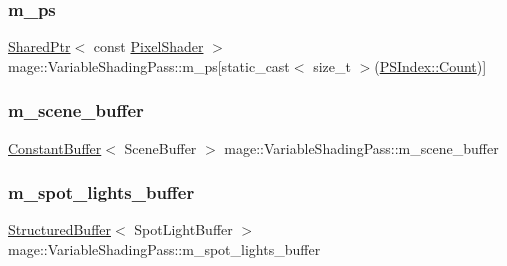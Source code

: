 \subsubsection{\texorpdfstring{m\+\_\+ps}{m\_ps}}
{\footnotesize\ttfamily \hyperlink{namespacemage_a1e01ae66713838a7a67d30e44c67703e}{Shared\+Ptr}$<$ const \hyperlink{namespacemage_ac98506b7edd999ea43ec46fbd0330238}{Pixel\+Shader} $>$ mage\+::\+Variable\+Shading\+Pass\+::m\+\_\+ps\mbox{[}static\+\_\+cast$<$ size\+\_\+t $>$(\hyperlink{classmage_1_1_variable_shading_pass_a49519e421ac5be93136d9efdbf075d4aae93f994f01c537c4e2f7d8528c3eb5e9}{P\+S\+Index\+::\+Count})\mbox{]}\hspace{0.3cm}{\ttfamily [private]}}

\hypertarget{classmage_1_1_variable_shading_pass_ae55088f911acc5f2f997a5ff6bcf333c}{}\label{classmage_1_1_variable_shading_pass_ae55088f911acc5f2f997a5ff6bcf333c} 
\subsubsection{\texorpdfstring{m\+\_\+scene\+\_\+buffer}{m\_scene\_buffer}}
{\footnotesize\ttfamily \hyperlink{structmage_1_1_constant_buffer}{Constant\+Buffer}$<$ Scene\+Buffer $>$ mage\+::\+Variable\+Shading\+Pass\+::m\+\_\+scene\+\_\+buffer\hspace{0.3cm}{\ttfamily [private]}}

\hypertarget{classmage_1_1_variable_shading_pass_a0ce22880761ceecd13a65450ca280d7c}{}\label{classmage_1_1_variable_shading_pass_a0ce22880761ceecd13a65450ca280d7c} 
\subsubsection{\texorpdfstring{m\+\_\+spot\+\_\+lights\+\_\+buffer}{m\_spot\_lights\_buffer}}
{\footnotesize\ttfamily \hyperlink{structmage_1_1_structured_buffer}{Structured\+Buffer}$<$ Spot\+Light\+Buffer $>$ mage\+::\+Variable\+Shading\+Pass\+::m\+\_\+spot\+\_\+lights\+\_\+buffer\hspace{0.3cm}{\ttfamily [private]}}

